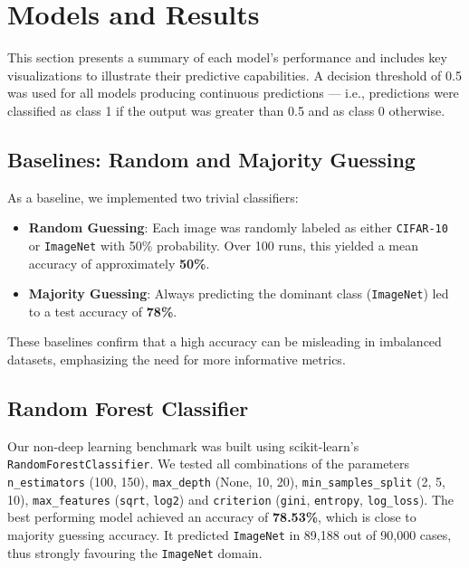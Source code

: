 \section{Models and Results}
\label{sec:Models and Results}
This section presents a summary of each model's performance and includes key visualizations to illustrate their predictive capabilities.
A decision threshold of 0.5 was used for all models producing continuous predictions — i.e., predictions were classified as class 1 if the output 
was greater than 0.5 and as class 0 otherwise.

\subsection{Baselines: Random and Majority Guessing}

As a baseline, we implemented two trivial classifiers:

\begin{itemize}
    \item \textbf{Random Guessing}: Each image was randomly labeled as either \texttt{CIFAR-10} or \texttt{ImageNet} with 50\% probability. Over 100 runs, this yielded a mean accuracy of approximately \textbf{50\%}.
    \item \textbf{Majority Guessing}: Always predicting the dominant class (\texttt{ImageNet}) led to a test accuracy of \textbf{78\%}.
\end{itemize}

These baselines confirm that a high accuracy can be misleading in imbalanced datasets, emphasizing the need for more informative metrics.

\subsection{Random Forest Classifier}

Our non-deep learning benchmark was built using scikit-learn's \texttt{RandomForestClassifier}. We tested all combinations of the parameters 
\texttt{n\_estimators} (100, 150), \texttt{max\_depth} (None, 10, 20), \texttt{min\_samples\_split} (2, 5, 10), \texttt{max\_features} (\texttt{sqrt}, \texttt{log2}) 
and \texttt{criterion} (\texttt{gini}, \texttt{entropy}, \texttt{log\_loss}). The best performing model achieved an accuracy of \textbf{78.53\%}, 
which is close to majority guessing accuracy. It predicted \texttt{ImageNet} in 89,188 out of 90,000 cases, thus strongly favouring the \texttt{ImageNet} domain.

